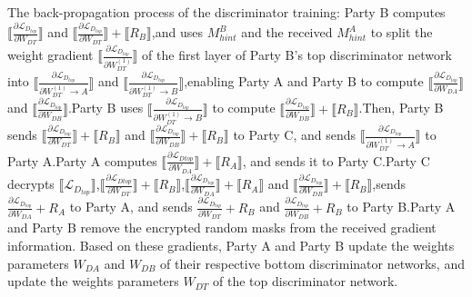 \documentclass[final,1p,times]{elsarticle}
\begin{document}
The back-propagation process of the discriminator training: Party B computes  $\llbracket\frac{\partial\mathcal{L}_{D_{top}}}{\partial W_{{DT}}}\rrbracket$ and $\llbracket\frac{\partial\mathcal{L}_{D_{top}}}{\partial W_{{DT}}}\rrbracket+\llbracket{R}_{{B}}\rrbracket$,and uses $M_{hint}^B$ and the received $M_{hint}^A$ to split the weight gradient $\llbracket\frac{\partial\mathcal{L}_{D_{top}}}{\partial{W}_{DT}^{(1)}}\rrbracket$ of the first layer of Party B's top discriminator network into $\llbracket\frac{\partial\mathcal{L}_{D_{top}}}{\partial W_{DT}^{(1)}\to A}\rrbracket$ and $\llbracket\frac{\partial\mathcal{L}_{D_{top}}}{\partial W_{DT}^{(1)}\rightarrow B}\rrbracket$,enabling Party A and Party B to compute $\llbracket\frac{\partial\mathcal{L}_{D_{top}}}{\partial {W}_{DA}}\rrbracket$ and $\llbracket\frac{\partial\mathcal{L}_{D_{top}}}{\partial W_{DB}}\rrbracket$.Party B uses $\llbracket\frac{\partial\mathcal{L}_{D_{top}}}{\partial W_{DT}^{(1)}\to B}\rrbracket$ to compute $\llbracket\frac{\partial{\mathcal{L}}_{D_{top}}}{\partial W_{DB}}\rrbracket+\llbracket{R}_{B}\rrbracket$.Then, Party B sends $\llbracket\frac{\partial\mathcal{L}_{D_{top}}}{\partial W_{DT}}\rrbracket+\llbracket{R}_{B}\rrbracket$ and $\llbracket\frac{\partial\mathcal{L}_{D_{top}}}{\partial{W}_{DB}}\rrbracket+\llbracket{R}_{B}\rrbracket$ to Party C, and sends $\llbracket\frac{\partial\mathcal{L}_{D_{top}}}{\partial W_{DT}^{(1)}\to A}\rrbracket$ to Party A.Party A computes $\llbracket\frac{\partial\mathcal{L}_{Dtop}}{\partial W_{DA}}\rrbracket+\llbracket R_{A}\rrbracket$, and sends it to Party C.Party C decrypts $\llbracket\mathcal{L}_{D_{top}}\rrbracket$,$\llbracket\frac{\partial\mathcal{L}_{Dtop}}{\partial W_{DT}}\rrbracket+\llbracket {R}_{B}\rrbracket$,$\llbracket\frac{\partial\mathcal{L}_{D_{top}}}{\partial{W}_{DA}}\rrbracket+\llbracket{R}_{A}\rrbracket$ and $\llbracket\frac{\partial\mathcal{L}_{D_{top}}}{\partial {W}_{DB}}\rrbracket+\llbracket{R}_{B}\rrbracket$,sends  $\frac{\partial\mathcal{L}_{D_{top}}}{\partial W_{DA}}+R_{A}$ to Party A, and sends $\frac{\partial\mathcal{L}_{D_{top}}}{\partial{W}_{DT}}+R_{B}$ and $\frac{\partial\mathcal{L}_{D_{top}}}{\partial W_{DB}}+R_{B}$ to Party B.Party A and Party B remove the encrypted random masks from the received gradient information. Based on these gradients, Party A and Party B update the weights parameters $W_{DA}$ and  $W_{DB}$ of their respective bottom discriminator networks, and update the weights parameters $W_{DT}$ of the top discriminator network.
\end{document}
